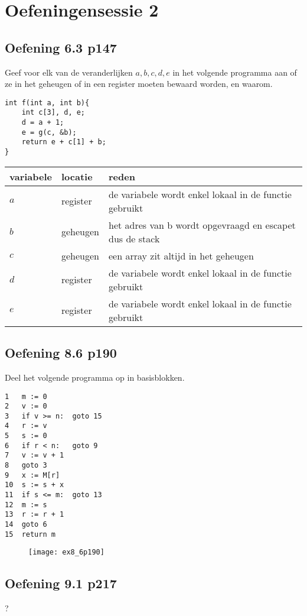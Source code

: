 \chapter{Oefeningensessie 2}

\section{Oefening 6.3 p147}
Geef voor elk van de veranderlijken $a, b, c, d, e$ in het volgende programma aan of ze in het geheugen of in een register moeten bewaard worden, en waarom.
\begin{lstlisting}
int f(int a, int b){
	int c[3], d, e;
	d = a + 1;
	e = g(c, &b);
	return e + c[1] + b;
}
\end{lstlisting}
\begin{table}[ht]
	\centering
	\begin{tabular}{l | l | l}
		variabele & locatie & reden \\
		\hline
		$a$ & register & de variabele wordt enkel lokaal in de functie gebruikt\\
		$b$ & geheugen & het adres van b wordt opgevraagd en escapet dus de stack\\
		$c$ & geheugen & een array zit altijd in het geheugen\\
		$d$ & register & de variabele wordt enkel lokaal in de functie gebruikt\\
		$e$ & register & de variabele wordt enkel lokaal in de functie gebruikt\\
	\end{tabular}
\end{table}
\section{Oefening 8.6 p190}
Deel het volgende programma op in basisblokken.
\begin{lstlisting}
1	m := 0
2	v := 0
3	if v >= n: 	goto 15
4	r := v
5 	s := 0
6	if r < n: 	goto 9
7	v := v + 1
8	goto 3
9	x := M[r]
10	s := s + x
11	if s <= m:	goto 13
12	m := s
13	r := r + 1
14 	goto 6
15 	return m
\end{lstlisting}


\begin{figure}[ht]
	\texttt{[image: ex8\_6p190]}
\end{figure}

\section{Oefening 9.1 p217}
?